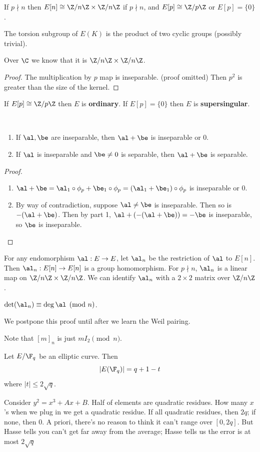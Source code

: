 \begin{thm}
If $p\nmid n$ then $E[n]\cong \Z/n\Z\times \Z/n\Z$ if $p\nmid n$, and $E[p]\cong \Z/p\Z$ or $E[p]=\{0\}$.
\end{thm}
\begin{cor}
The torsion subgroup of $E(K)$ is the product of two cyclic groups (possibly trivial).%
\end{cor}
Over $\C$ we know that it is $\Z/n\Z\times \Z/n\Z$.
\begin{proof}
The multiplication by $p$ map is inseparable. (proof omitted) Then $p^2$ is greater than the size of the kernel.
\end{proof}
\begin{df}
If $E[p]\cong \Z/p\Z$ then $E$ is \textbf{ordinary}. If $E[p]=\{0\}$ then $E$ is \textbf{supersingular}. 
\end{df}
\begin{lem}$\,$
\begin{enumerate}
\item
If $\al,\be$ are inseparable, then $\al+\be$ is inseparable or 0.
\item
If $\al$ is inseparable and $\be\ne 0$ is separable, then $\al+\be$ is separable.
\end{enumerate}
\end{lem}
\begin{proof}
\begin{enumerate}
\item
$\al+\be=\al_1\circ \phi_p+\be_1\circ \phi_p=(\al_1+\be_1)\circ \phi_p$ is inseparable or 0.
\item
By way of contradiction, suppose $\al\ne \be $ is inseparable. Then so is $-(\al+\be)$. Then by part 1, $\al+(-(\al+\be))=-\be$ is inseparable, so $\be$ is inseparable.
\end{enumerate}
\end{proof}
For any endomorphism $\al:E\to E$, let $\al_n$ be the restriction of $\al$ to $E[n]$. Then $\al_n:E[n]\to E[n]$ is a group homomorphism. For $p\nmid n$, $\al_n$ is a linear map on $\Z/n\Z\times \Z/n\Z$. We can identify $\al_n$ with a $2\times 2$ matrix over $\Z/n\Z$. 
\begin{thm}
$\det(\al_n)\equiv \deg\al\pmod n$.
\end{thm}
We postpone this proof until after we learn the Weil pairing.

Note that $[m]_n$ is just $mI_2\pmod n$.
\begin{thm}[Hasse]
Let $E/\F_q$ be an elliptic curve. Then 
\[
|E(\F_q)|=q+1-t
\]
where $|t|\le 2\sqrt q$.
\end{thm}
Consider $y^2=x^3+Ax+B$. Half of elements are quadratic residues. How many $x$'s when we plug in we get a quadratic residue. If all quadratic residues, then $2q$; if none, then 0. A priori, there's no reason to think it can't range over $[0,2q]$. But Hasse tells you can't get far away from the average; Hasse tells us the error is at most $2\sqrt q$
